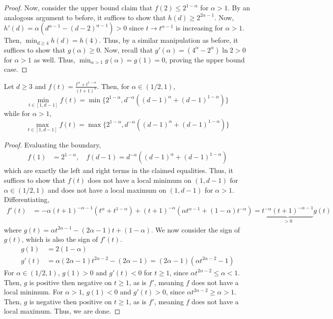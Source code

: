 \documentclass[11pt]{article}
\begin{document}
\begin{proof}
Now, consider the upper bound claim that $f(2)\leq 2^{1-\alpha}$ for $\alpha > 1$. By an analogous argument to before, it suffices to show that $h(d)\geq 2^{2\alpha-1}$. Now, $h'(d)=\alpha (d^{\alpha-1}-(d-2)^{\alpha-1})>0$ since $t\to t^{\alpha-1}$ is increasing for $\alpha > 1$. Then, $\min_{d\geq 4}h(d)=h(4)$. Thus, by a similar manipulation as before, it suffices to show that $g(\alpha)\geq 0$. Now, recall that $g'(\alpha)=(4^\alpha-2^\alpha )\ln 2> 0 $ for $\alpha > 1$ as well. Thus, $\min_{\alpha>1}g(\alpha)=g(1)=0$, proving the upper bound case. 
\end{proof}

\begin{lemma}\label{lemma:m2-left-min}
   Let $d\geq 3$ and $f(t)=\frac{t^{\alpha}+t^{1-\alpha}}{(t+1)^{\alpha}}$. Then, for $\alpha \in (1/2,1)$,
   $$\min_{t\in [1,d-1]}f(t)=\min\{2^{1-\alpha},d^{-\alpha}((d-1)^\alpha+(d-1)^{1-\alpha})\}$$
   while for $\alpha>1$, 
   $$\max_{t\in [1,d-1]}f(t)=\max\{2^{1-\alpha},d^{-\alpha}((d-1)^\alpha+(d-1)^{1-\alpha})\}$$
\end{lemma}
\begin{proof}
Evaluating the boundary, 
\begin{align*}
    f(1)&
    =2^{1-\alpha},
    \quad f(d-1)
    =d^{-\alpha}((d-1)^\alpha+(d-1)^{1-\alpha})
\end{align*}
which are exactly the left and right terms in the claimed equalities. Thus, it suffices to show that $f(t)$ does not have a local minimum on $(1,d-1)$ for $\alpha \in (1/2,1)$ and does not have a local maximum on $(1,d-1)$ for $\alpha >1$.
Differentiating,
\begin{align*}
    f'(t)&=-\alpha (t+1)^{-\alpha-1}(t^\alpha+t^{1-\alpha})+(t+1)^{-\alpha}(\alpha t^{\alpha-1}+(1-\alpha)t^{-\alpha})
    =\underbrace{t^{-\alpha}(t+1)^{-\alpha-1}}_{>0}g(t)
\end{align*}
where $g(t)=\alpha t^{2\alpha-1}-(2\alpha-1)t+(1-\alpha)$. We now consider the sign of $g(t)$, which is also the sign of $f'(t)$. 
\begin{align*}
    g(1)&
    =2(1-\alpha)\\
    g'(t)&=\alpha(2\alpha-1)t^{2\alpha-2}-(2\alpha-1)= (2\alpha-1)(\alpha t^{2\alpha-2}-1)
\end{align*}
For $\alpha \in (1/2,1)$, $g(1)> 0$ and $g'(t)<0$ for $t\geq 1$, since $\alpha t^{2\alpha-2}\leq \alpha <1$. Then, $g$ is positive then negative on $t\geq 1$, as is $f'$, meaning $f$ does not have a local minimum. For $\alpha > 1$, $g(1)<0$ and $g'(t)>0$, since $\alpha t^{2\alpha -2}\geq \alpha > 1$. Then, $g$ is negative then positive on $t\geq 1$, as is $f'$, meaning $f$ does not have a local maximum. Thus, we are done. 
\end{proof}
\end{document}
